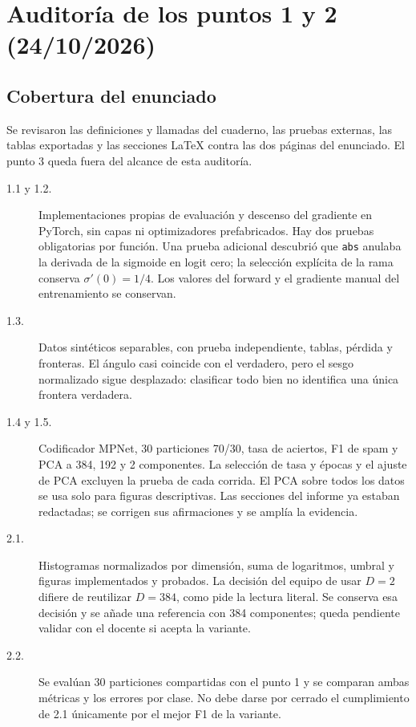 \documentclass[11pt,letterpaper]{article}
\renewcommand{\_}{\originalunderscore\allowbreak}
\begin{document}
\section{Auditoría de los puntos 1 y 2 (24/10/2026)}
\label{sec:auditoria}
\subsection{Cobertura del enunciado}
Se revisaron las definiciones y llamadas del cuaderno, las pruebas externas,
las tablas exportadas y las secciones LaTeX contra las dos páginas del
enunciado. El punto 3 queda fuera del alcance de esta auditoría.
\begin{description}
\item[1.1 y 1.2.] Implementaciones propias de evaluación y descenso del
gradiente en PyTorch, sin capas ni optimizadores prefabricados. Hay dos
pruebas obligatorias por función. Una prueba adicional descubrió que
\texttt{abs} anulaba la derivada de la sigmoide en logit cero; la selección
explícita de la rama conserva $\sigma'(0)=1/4$. Los valores del forward y
el gradiente manual del entrenamiento se conservan.
\item[1.3.] Datos sintéticos separables, con prueba independiente, tablas,
pérdida y fronteras. El ángulo casi coincide con el verdadero, pero el sesgo
normalizado sigue desplazado: clasificar todo bien no identifica una única
frontera verdadera.
\item[1.4 y 1.5.] Codificador MPNet, 30 particiones 70/30, tasa de aciertos,
F1 de spam y PCA a 384, 192 y 2 componentes. La selección de tasa y épocas
y el ajuste de PCA excluyen la prueba de cada corrida. El PCA sobre todos
los datos se usa solo para figuras descriptivas. Las secciones del informe
ya estaban redactadas; se corrigen sus afirmaciones y se amplía la evidencia.
\item[2.1.] Histogramas normalizados por dimensión, suma de logaritmos,
umbral y figuras implementados y probados. La decisión del equipo de usar
$D=2$ difiere de reutilizar $D=384$, como pide la lectura literal. Se
conserva esa decisión y se añade una referencia con 384 componentes;
queda pendiente validar con el docente si acepta la variante.
\item[2.2.] Se evalúan 30 particiones compartidas con el punto 1 y se
comparan ambas métricas y los errores por clase. No debe darse por cerrado
el cumplimiento de 2.1 únicamente por el mejor F1 de la variante.
\end{description}
\end{document}
